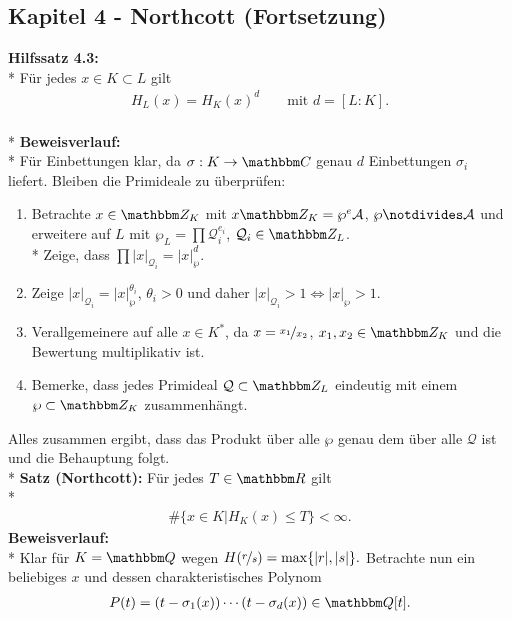 \documentclass[ngerman,11pt,a4paper,titlepage]{article}
\newcommand{\C}{\mathbbm C}
\newcommand{\R}{\mathbbm R}
\newcommand{\Q}{\mathbbm Q}
\newcommand{\Z}{\mathbbm Z}
\newcommand{\A}{\mathcal{A}}
\newcommand{\iQ}{\mathcal{Q}}
\begin{document}
\rhead{\today}
\cfoot{}
\subsection*{Kapitel 4 - Northcott (Fortsetzung)}
\vspace{5mm}
\textbf{Hilfssatz 4.3:}
\\*
Für jedes $x \in K \subset L$ gilt
\begin{align*}
  H_L(x) = H_K(x)^d && \text{ mit } d = [L:K] .
\end{align*}
\vspace{-3mm}
\\*
\textbf{Beweisverlauf:}
\\*
Für Einbettungen klar, da $\sigma : K \to \C$ genau $d$ Einbettungen $\sigma_i$ liefert. Bleiben die Primideale zu überprüfen:
\renewcommand{\labelenumi}{(\roman{enumi})}
\begin{enumerate}
  \item Betrachte $x\in \Z_K$ mit $x\Z_K=\wp^e\A$, $\wp \notdivides \A$ und erweitere auf $L$ mit $\wp_{L} = \prod \iQ_i^{e_i}$, $\iQ_i \in \Z_L$.
    \vspace{2mm}
    \\*
    Zeige, dass $\prod |x|_{\iQ_i}=|x|_{\wp}^d.$
  \item Zeige $|x|_{\iQ_i}=|x|_{\wp}^{\theta_i}$, $\theta_i > 0$ und daher $|x|_{\iQ_i} > 1 \Leftrightarrow |x|_{\wp} > 1$.
  \item Verallgemeinere auf alle $x \in K^*$, da $x=\nicefrac{x_1}{x_2}$, $x_1,x_2\in \Z_K$ und die Bewertung multiplikativ ist.
  \item Bemerke, dass jedes Primideal $\iQ \subset \Z_L$ eindeutig mit einem $\wp\subset \Z_K$ zusammenhängt.
\end{enumerate}
Alles zusammen ergibt, dass das Produkt über alle $\wp$ genau dem über alle $\iQ$ ist und die Behauptung folgt.
%
\vspace{8mm}
\\*
\textbf{Satz (Northcott):} Für jedes $T\in \R$ gilt
\\*
\begin{align*}
  \#\{x\in K | H_K(x) \leq T \} < \infty.
\end{align*}
\textbf{Beweisverlauf:}
\\*
Klar für $K= \Q$ wegen $H(\nicefrac{r}{s})=\max \{|r|,|s| \}.$ Betrachte nun ein beliebiges $x$ und dessen charakteristisches Polynom
\begin{align*}
  P(t)=(t-\sigma_1(x)) \cdots (t-\sigma_d(x)) \in \Q [t].
\end{align*}
\end{document}
